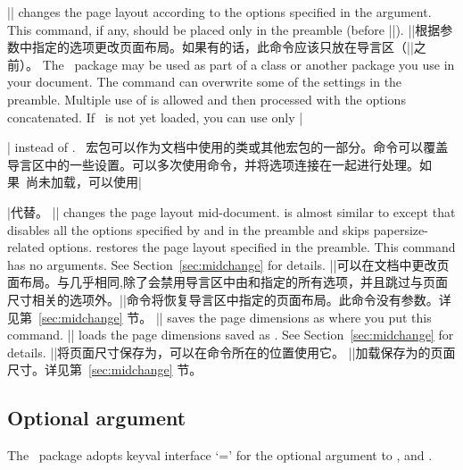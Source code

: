 \begin{paracol}{2}
||
changes the page layout according to the options specified in the
argument. This command, if any, should be placed only in the
preamble (before ||).
\switchcolumn
||根据参数中指定的选项更改页面布局。如果有的话，此命令应该只放在导言区（||之前）。
\switchcolumn
The \Gm\ package may be used as part of a class or another package
you use in your document. The command  can overwrite
some of the settings in the preamble. Multiple use of 
is allowed and then processed with the options concatenated.
If \Gm\ is not yet loaded, you can use only
|\usepackage[||]{geometry}| instead of .
\switchcolumn
\Gm\ 宏包可以作为文档中使用的类或其他宏包的一部分。命令可以覆盖导言区中的一些设置。可以多次使用命令，并将选项连接在一起进行处理。如果\Gm\ 尚未加载，可以使用|\usepackage[||]{geometry}|代替。    
\switchcolumn
\medskip
||
changes the page layout mid-document.  is almost
similar to  except that  disables all
the options specified by  and  in
the preamble and skips papersize-related options. 
restores the page layout specified in the preamble. This command
has no arguments. See Section~\ref{sec:midchange} for details.
\switchcolumn
\medskip
||可以在文档中更改页面布局。与几乎相同,除了会禁用导言区中由和指定的所有选项，并且跳过与页面尺寸相关的选项外。|\restoregeometry|命令将恢复导言区中指定的页面布局。此命令没有参数。详见第~\ref{sec:midchange} 节。
\switchcolumn[0]
\medskip
||
saves the page dimensions as  where you put
this command.
||
loads the page dimensions saved as . See
Section~\ref{sec:midchange} for details.
\switchcolumn
\medskip
||将页面尺寸保存为，可以在命令所在的位置使用它。
||加载保存为的页面尺寸。详见第~\ref{sec:midchange} 节。
\end{paracol}


\subsection{Optional argument}

The \Gm\ package adopts \textsf{keyval} interface
`=' for the optional argument to
,  and .

